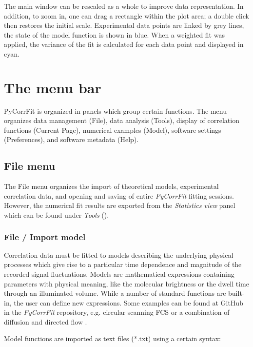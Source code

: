 The main window can be rescaled as a whole to improve data representation. In addition, to zoom in, one can drag a rectangle within the plot area; a double click then restores the initial scale. Experimental data points are linked by grey lines, the state of the model function is shown in blue. When a weighted fit was applied, the variance of the fit is calculated for each data point and displayed in cyan.

\section{The menu bar}
\label{sec:menub}

PyCorrFit is organized in panels which group certain functions. The menu organizes data management (File), data analysis (Tools), display of correlation functions (Current Page), numerical examples (Model), software settings (Preferences), and software metadata (Help).

\subsection{File menu}
\label{sec:menub.filem}
The File menu organizes the import of theoretical models, experimental correlation data, and opening and saving of entire \textit{PyCorrFit} fitting sessions. However, the numerical fit results are exported from the \textit{Statistics view} panel which can be found under \textit{Tools} ().

\subsubsection{File / Import model}
\label{sec:menub.filem.impor}
Correlation data must be fitted to models describing the underlying physical processes which give rise to a particular time dependence and magnitude of the recorded signal fluctuations. Models are mathematical expressions containing parameters with physical meaning, like the molecular brightness or the dwell time through an illuminated volume. While a number of standard functions are built-in, the user can define new expressions. Some examples can be found at GitHub in the \textit{PyCorrFit} repository, e.g. circular scanning FCS \cite{Petrasek2008} or a combination of diffusion and directed flow \cite{Brinkmeier1999}.

Model functions are imported as text files (*.txt) using a certain syntax:

